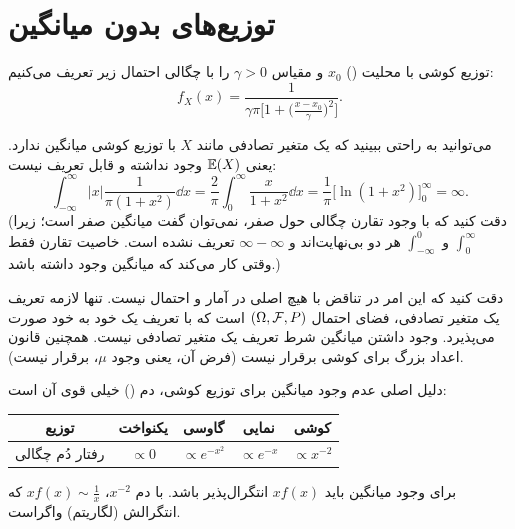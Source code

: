 \section{توزیع‌های بدون میانگین}

\begin{definition}
توزیع کوشی با محلیت () $x_0$ و مقیاس $\gamma>0$ را با چگالی احتمال زیر تعریف می‌کنیم:
\[
f_X(x)=\frac{1}{\gamma\pi\Big[1+\big(\frac{x-x_0}{\gamma}\big)^2\Big]}.
\]
\end{definition}

\begin{center}
\end{center}

می‌توانید به راحتی ببینید که یک متغیر تصادفی مانند $X$ با توزیع کوشی میانگین ندارد. یعنی $\mathbb{E}(X)$ وجود نداشته و قابل تعریف نیست:
\[
\int_{-\infty}^{\infty}|x|\frac{1}{\pi(1+x^2)}\dd x=\frac{2}{\pi}\int_0^\infty\frac{x}{1+x^2}\dd x=\frac1\pi\Big[\ln(1+x^2)\Big]_0^\infty=\infty .
\]
(دقت کنید که با وجود تقارن چگالی حول صفر، نمی‌توان گفت میانگین صفر است؛ زیرا $\int_0^\infty$ و $\int_{-\infty}^0$ هر دو بی‌نهایت‌اند و $\infty-\infty$ تعریف نشده است. خاصیت تقارن فقط وقتی کار می‌کند که میانگین وجود داشته باشد.)

\begin{note}
\notetitle دقت کنید که این امر در تناقض با هیچ اصلی در آمار و احتمال نیست. تنها لازمه تعریف یک متغیر تصادفی، فضای احتمال $(\Omega,\mathcal{F},P)$ است که با تعریف یک  خود به خود صورت می‌پذیرد. \textcolor{red!70!black}{وجود داشتن میانگین شرط تعریف یک متغیر تصادفی نیست.} همچنین قانون اعداد بزرگ برای کوشی برقرار نیست (فرض آن، یعنی وجود $\mu$، برقرار نیست).
\end{note}

دلیل اصلی عدم وجود میانگین برای توزیع کوشی، دم () خیلی قوی آن است:
\begin{center}
\renewcommand{\arraystretch}{1.4}
\begin{tabular}{c|c|c|c|c}
توزیع & یکنواخت & گاوسی & نمایی & کوشی\\\hline
رفتار دُم چگالی & $\propto0$ & $\propto e^{-x^2}$ & $\propto e^{-x}$ & $\propto x^{-2}$
\end{tabular}
\end{center}
برای وجود میانگین باید $xf(x)$ انتگرال‌پذیر باشد. با دم $x^{-2}$، $xf(x)\sim\frac1x$ که انتگرالش (لگاریتم) واگراست.


